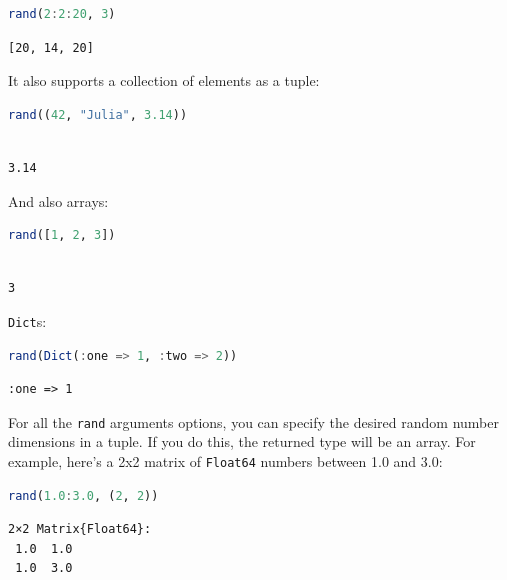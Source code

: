\documentclass[
  notoc %
]{tufte-book}
\newcommand{\passthrough}[1]{#1}
\begin{document}
\begin{lstlisting}[language=Julia]
rand(2:2:20, 3)
\end{lstlisting}

\begin{lstlisting}[language=Output]
[20, 14, 20]
\end{lstlisting}

It also supports a collection of elements as a tuple:

\begin{lstlisting}[language=Julia]
rand((42, "Julia", 3.14))
\end{lstlisting}

\begin{lstlisting}[language=Output]

3.14

\end{lstlisting}

And also arrays:

\begin{lstlisting}[language=Julia]
rand([1, 2, 3])
\end{lstlisting}

\begin{lstlisting}[language=Output]

3

\end{lstlisting}

\passthrough{\lstinline!Dict!}s:

\begin{lstlisting}[language=Julia]
rand(Dict(:one => 1, :two => 2))
\end{lstlisting}

\begin{lstlisting}[language=Output]
:one => 1
\end{lstlisting}

For all the \passthrough{\lstinline!rand!} arguments options, you can
specify the desired random number dimensions in a tuple. If you do this,
the returned type will be an array. For example, here's a 2x2 matrix of
\passthrough{\lstinline!Float64!} numbers between 1.0 and 3.0:

\begin{lstlisting}[language=Julia]
rand(1.0:3.0, (2, 2))
\end{lstlisting}

\begin{lstlisting}[language=Output]
2×2 Matrix{Float64}:
 1.0  1.0
 1.0  3.0
\end{lstlisting}
\end{document}
